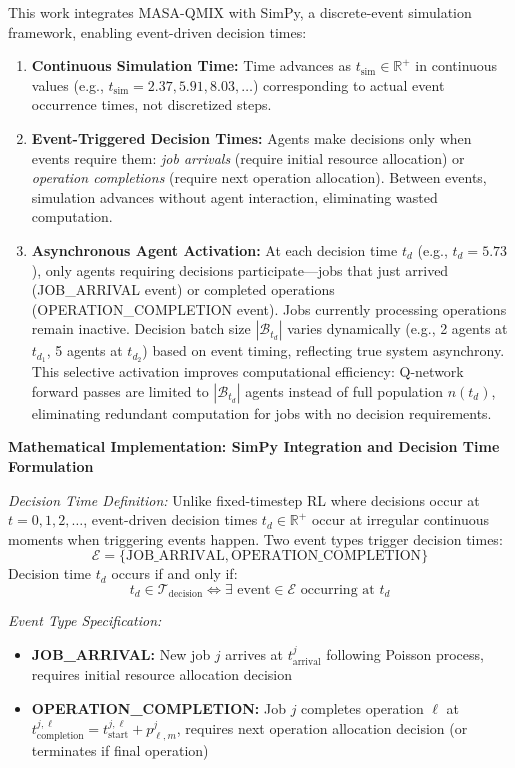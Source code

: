 This work integrates MASA-QMIX with SimPy, a discrete-event simulation framework, enabling event-driven decision times:

\begin{enumerate}
\item \textbf{Continuous Simulation Time:} Time advances as \( t_{\text{sim}} \in \mathbb{R}^+ \) in continuous values (e.g., \( t_{\text{sim}} = 2.37, 5.91, 8.03, \ldots \)) corresponding to actual event occurrence times, not discretized steps.

\item \textbf{Event-Triggered Decision Times:} Agents make decisions only when events require them: \textit{job arrivals} (require initial resource allocation) or \textit{operation completions} (require next operation allocation). Between events, simulation advances without agent interaction, eliminating wasted computation.

\item \textbf{Asynchronous Agent Activation:} At each decision time \( t_d \) (e.g., \( t_d = 5.73 \)), only agents requiring decisions participate—jobs that just arrived (JOB\_ARRIVAL event) or completed operations (OPERATION\_COMPLETION event). Jobs currently processing operations remain inactive. Decision batch size \( |\mathcal{B}_{t_d}| \) varies dynamically (e.g., 2 agents at \( t_{d_1} \), 5 agents at \( t_{d_2} \)) based on event timing, reflecting true system asynchrony. This selective activation improves computational efficiency: Q-network forward passes are limited to \( |\mathcal{B}_{t_d}| \) agents instead of full population \( n(t_d) \), eliminating redundant computation for jobs with no decision requirements.
\end{enumerate}

\textbf{Mathematical Implementation: SimPy Integration and Decision Time Formulation}

\textit{Decision Time Definition:} Unlike fixed-timestep RL where decisions occur at \( t = 0, 1, 2, \ldots \), event-driven decision times \( t_d \in \mathbb{R}^+ \) occur at irregular continuous moments when triggering events happen. Two event types trigger decision times:
\[
\mathcal{E} = \{\text{JOB\_ARRIVAL}, \text{OPERATION\_COMPLETION}\}
\]
Decision time \( t_d \) occurs if and only if:
\[
t_d \in \mathcal{T}_{\text{decision}} \iff \exists \text{ event} \in \mathcal{E} \text{ occurring at } t_d
\]

\textit{Event Type Specification:}
\begin{itemize}
\item \textbf{JOB\_ARRIVAL:} New job \( j \) arrives at \( t_{\text{arrival}}^j \) following Poisson process, requires initial resource allocation decision
\item \textbf{OPERATION\_COMPLETION:} Job \( j \) completes operation \( \ell \) at \( t_{\text{completion}}^{j,\ell} = t_{\text{start}}^{j,\ell} + p_{\ell,m}^j \), requires next operation allocation decision (or terminates if final operation)
\end{itemize}

